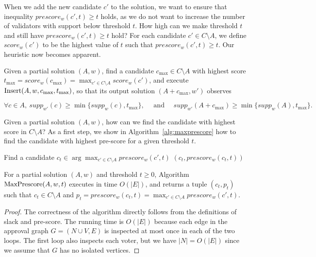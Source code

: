 When we add the new candidate $c'$ to the solution, we want to ensure that inequality $prescore_w(c',t)\geq t$ holds, as we do not want to increase the number of validators with support below threshold $t$. How high can we make threshold $t$ and still have $prescore_w(c',t)\geq t$ hold? For each candidate $c'\in C\setminus A$, we define $score_w(c')$ to be the highest value of $t$ such that $prescore_w(c',t) \geq t$. Our heuristic now becomes apparent.

\begin{heuristic}
Given a partial solution $(A,w)$, find a candidate $c_{\max}\in C\setminus A$ with highest score $t_{\max}=score_w(c_{\max})=\max_{c'\in C\setminus A} score_w(c')$, and execute $\operatorname{Insert}(A,w,c_{\max},t_{\max})$, so that its output solution $(A+c_{\max},w')$ observes 

$$\forall c\in A, \ supp_{w'}(c)\geq \min\{supp_w(c), t_{\max}\}, \quad \text{ and } \quad supp_{w'}(A+c_{\max})\geq \min \Big\{ supp_w(A), t_{\max}\Big\}.$$
\end{heuristic}

Given a partial solution $(A,w)$, how can we find the candidate with highest score in $C\setminus A$? 
As a first step, we show in Algorithm~\ref{alg:maxprescore} how to find the candidate with highest pre-score for a given threshold $t$.

\begin{algorithm}[htb]\label{alg:maxprescore}
\SetAlgoLined
{}
Find a candidate $c_t\in\arg\max_{c'\in C\setminus A} prescore_w(c', t)$\;
\Return $(c_t, prescore_w(c_t, t))$\;
 \caption{$\maxprescore(A,w,t)$}
\end{algorithm}

\begin{lemma}
For a partial solution $(A,w)$ and threshold $t\geq 0$, Algorithm $\maxprescore(A,w,t)$ executes in time $O(|E|)$, and returns a tuple $(c_t,p_t)$ such that $c_t\in C\setminus A$ and $p_t=prescore_w(c_t,t)=\max_{c'\in C\setminus A} prescore_w(c',t)$.
\end{lemma}

\begin{proof}
The correctness of the algorithm directly follows from the definitions of slack and pre-score. The running time is $O(|E|)$ because each edge in the approval graph $G=(N\cup V, E)$ is inspected at most once in each of the two loops. The first loop also inspects each voter, but we have $|N|=O(|E|)$ since we assume that $G$ has no isolated vertices.
\end{proof}

